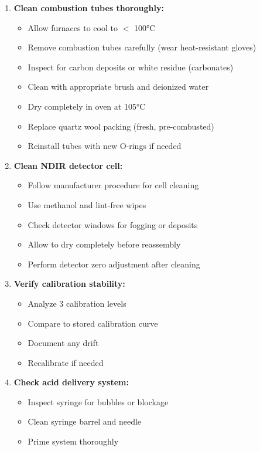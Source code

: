 \documentclass[11pt,a4paper]{article}\usepackage[]{graphicx}\usepackage[]{xcolor}
\begin{document}
\begin{enumerate}[noitemsep]
    \item \textbf{Clean combustion tubes thoroughly:}
    \begin{itemize}
        \item Allow furnaces to cool to $<$ 100°C
        \item Remove combustion tubes carefully (wear heat-resistant gloves)
        \item Inspect for carbon deposits or white residue (carbonates)
        \item Clean with appropriate brush and deionized water
        \item Dry completely in oven at 105°C
        \item Replace quartz wool packing (fresh, pre-combusted)
        \item Reinstall tubes with new O-rings if needed
    \end{itemize}
    \item \textbf{Clean NDIR detector cell:}
    \begin{itemize}
        \item Follow manufacturer procedure for cell cleaning
        \item Use methanol and lint-free wipes
        \item Check detector windows for fogging or deposits
        \item Allow to dry completely before reassembly
        \item Perform detector zero adjustment after cleaning
    \end{itemize}
    \item \textbf{Verify calibration stability:}
    \begin{itemize}
        \item Analyze 3 calibration levels
        \item Compare to stored calibration curve
        \item Document any drift
        \item Recalibrate if needed
    \end{itemize}
    \item \textbf{Check acid delivery system:}
    \begin{itemize}
        \item Inspect syringe for bubbles or blockage
        \item Clean syringe barrel and needle
        \item Prime system thoroughly

\end{itemize}
\end{enumerate}
\end{document}
